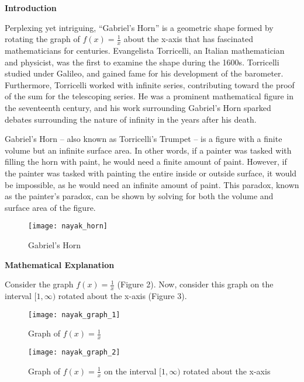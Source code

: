 \noindent
\textbf{Introduction}

	Perplexing yet intriguing, “Gabriel’s Horn” is a geometric shape formed by rotating the graph of $f(x)=\frac{1}{x}$ about the x-axis that has fascinated mathematicians for centuries. Evangelista Torricelli, an Italian mathematician and physicist, was the first to examine the shape during the 1600s. Torricelli studied under Galileo, and gained fame for his development of the barometer. Furthermore, Torricelli worked with infinite series, contributing toward the proof of the sum for the telescoping series. He was a prominent mathematical figure in the seventeenth century, and his work surrounding Gabriel’s Horn sparked debates surrounding the nature of infinity in the years after his death.

	Gabriel’s Horn – also known as Torricelli’s Trumpet – is a figure with a finite volume but an infinite surface area. In other words, if a painter was tasked with filling the horn with paint, he would need a finite amount of paint. However, if the painter was tasked with painting the entire inside or outside surface, it would be impossible, as he would need an infinite amount of paint. This paradox, known as the painter’s paradox, can be shown by solving for both the volume and surface area of the figure.
\\
\renewcommand{\thefigure}{1}
\begin{figure}[h!]
  \begin{center}
    \texttt{[image: nayak\_horn]}
    \caption{Gabriel's Horn}
    \label{fig:1} 
  \end{center}
\end{figure}

\newpage
\noindent
\textbf{Mathematical Explanation}

	Consider the graph $f(x)=\frac{1}{x}$ (Figure 2). Now, consider this graph on the interval $[1,\infty)$ rotated about the x-axis (Figure 3).
	
\renewcommand{\thefigure}{2}
\begin{figure}[h]
  \begin{center}
    \texttt{[image: nayak\_graph\_1]}
  \end{center}
  \caption{Graph of $f(x)=\frac{1}{x}$}
  \label{fig:2}
\end{figure}

\renewcommand{\thefigure}{3}
\begin{figure}[h]
  \begin{center}
    \texttt{[image: nayak\_graph\_2]}
  \end{center}
  \caption{Graph of $f(x)=\frac{1}{x}$ on the interval $[1,\infty)$ rotated about the x-axis}
  \label{fig:3}
\end{figure}

